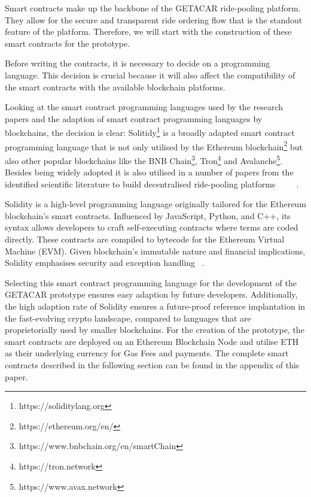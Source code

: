 Smart contracts make up the backbone of the GETACAR ride-pooling platform. They allow for the secure and transparent ride ordering flow that is the standout feature of the platform. Therefore, we will start with the construction of these smart contracts for the prototype. 

Before writing the contracts, it is necessary to decide on a programming language. This decision is crucial because it will also affect the compatibility of the smart contracts with the available blockchain platforms. 

Looking at the smart contract programming languages used by the research papers and the adaption of smart contract programming languages by blockchains, the decision is clear: Solitidy\footnote{https://soliditylang.org} is a broadly adapted smart contract programming language that is not only utilised by the Ethereum blockchain\footnote{https://ethereum.org/en/} but also other popular blockchains like the BNB Chain\footnote{https://www.bnbchain.org/en/smartChain}, Tron\footnote{https://tron.network} and Avalanche\footnote{https://www.avax.network}. Besides being widely adopted it is also utilised in a number of papers from the identified scientific literature to build decentralised ride-pooling platforms ~\cite{Baza.2021} ~\cite{Mahmoud.2022} ~\cite{Baza.52520205282020}.

Solidity is a high-level programming language originally tailored for the Ethereum blockchain's smart contracts. Influenced by JavaScript, Python, and C++, its syntax allows developers to craft self-executing contracts where terms are coded directly. These contracts are compiled to bytecode for the Ethereum Virtual Machine (EVM). Given blockchain's immutable nature and financial implications, Solidity emphasises security and exception handling ~\cite{Solidity.}. 

Selecting this smart contract programming language for the development of the GETACAR prototype ensures easy adaption by future developers. Additionally, the high adaption rate of Solidity ensures a future-proof reference implantation in the fast-evolving crypto landscape, compared to languages that are proprietorially used by smaller blockchains. For the creation of the prototype, the smart contracts are deployed on an Ethereum Blockchain Node and utilise ETH as their underlying currency for Gas Fees and payments. The complete smart contracts described in the following section can be found in the appendix of this paper.


